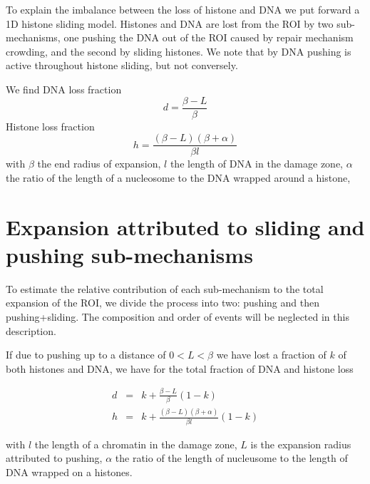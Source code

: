 \documentclass[12pt]{report}
\begin{document}
		To explain the imbalance between the loss of histone and DNA we put forward a 1D histone sliding model. Histones and DNA are lost from the ROI by two sub-mechanisms, one pushing the DNA out of the ROI caused by repair mechanism crowding, and the second by sliding histones. We note that by DNA pushing is active throughout histone sliding, but not conversely.
		
		We find DNA loss fraction
		\begin{equation*}
        d=\frac{\beta-L}{\beta}
		\end{equation*}
		Histone loss fraction 
		\begin{equation*}
			h=\frac{(\beta -L)(\beta+\alpha)}{\beta l}
		\end{equation*}
		with $\beta$ the end radius of expansion, $l$ the length of DNA in the damage zone, $\alpha$ the ratio of the length of a nucleosome to the DNA wrapped around a histone, 
				
		
		
		\section{Expansion attributed to sliding and pushing sub-mechanisms}
		To estimate the relative contribution of each sub-mechanism to the total expansion of the ROI, we divide the process into two: pushing and then pushing+sliding. The composition and order of events will be neglected in this description. 
		
	    If due to pushing up to a distance of $0<L<\beta$ we have lost a fraction of $k$ of both histones and DNA, we have for the total fraction of DNA and histone loss
         
		\begin{eqnarray*}
			d &=& k+\frac{\beta-L}{\beta}(1-k) \\
			h &=& k+\frac{(\beta-L)(\beta+\alpha)}{\beta l}(1-k)
		\end{eqnarray*}
		
     	with $l$ the length of a chromatin in the damage zone, $L$ is the expansion radius attributed to pushing, $\alpha$ the ratio of the length of nucleusome to the length of DNA wrapped on a histones. 
     	
\end{document}
